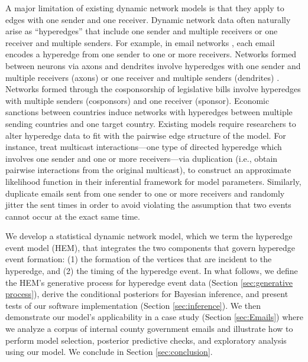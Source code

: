 \documentclass[ba]{imsart}
\numberwithin{equation}{section}
\theoremstyle{plain}
\begin{document}
	A major limitation of existing dynamic network models is that they apply to edges with one sender and one receiver. Dynamic network data often naturally arise as ``hyperedges'' \citep{karypis1999multilevel,ghoshal2009random,zlatic2009hypergraph,zhang2010hypergraph} that include one sender and multiple receivers or one receiver and multiple senders. For example, in email networks \citep{newman2002email}, each email encodes a hyperedge from one sender to one or more receivers. Networks formed between neurons via axons and dendrites involve hyperedges with one sender and multiple receivers (axons) or one receiver and multiple senders (dendrites) \citep{partzsch2012developing}. Networks formed through the cosponsorship of legislative bills \citep{fowler2006legislative} involve hyperedges with multiple senders (cosponsors) and one receiver (sponsor). Economic sanctions between countries \citep{cranmer2014reciprocity} induce networks with hyperedges between multiple sending countries and one target country. Existing models require researchers to alter hyperedge data to fit with the pairwise edge structure of the model. For instance, \cite{PerryWolfe2012} treat multicast interactions---one type of directed hyperedge which involves one sender and one or more receivers---via duplication (i.e., obtain pairwise interactions from the original multicast), to construct an approximate likelihood function in their inferential framework for model parameters. Similarly, \cite{fan2009learning} duplicate emails sent from one sender to one or more receivers and randomly jitter the sent times in order to avoid violating the assumption that two events cannot occur at the exact same time. %
	
	We develop a statistical dynamic network model, which we term the hyperedge event model (HEM), that integrates the two components that govern hyperedge event formation: (1) the formation of the vertices that are incident to the hyperedge, and (2) the timing of the hyperedge event. In what follows, we define the HEM's generative process for hyperedge event data (Section \ref{sec:generative process}), derive the conditional posteriors for Bayesian inference, and present tests of our software implementation (Section \ref{sec:inference}). We then demonstrate our model's applicability in a case study (Section \ref{sec:Emails}) where we analyze a corpus of internal county government emails and illustrate how to perform model selection, posterior predictive checks, and exploratory analysis using our model. We conclude in Section \ref{sec:conclusion}.~
	
\end{document}
